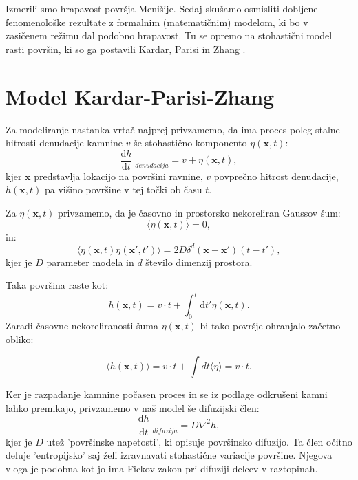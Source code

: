\documentclass[a4paper, twoside, 12pt]{book}
\begin{document}
Izmerili smo hrapavost površja Menišije. Sedaj skušamo osmisliti dobljene fenomenološke rezultate z formalnim (matematičnim) modelom, ki bo v zasičenem režimu dal podobno hrapavost. Tu se opremo na stohastični model rasti površin, ki so ga postavili Kardar, Parisi in Zhang \cite{kardar1986dynamic}.

    \section{Model Kardar-Parisi-Zhang}

    Za modeliranje nastanka vrtač najprej privzamemo, da ima proces poleg stalne hitrosti denudacije kamnine $v$ še stohastično komponento $\eta(\mathbf{x},t)$:
\begin{equation}
  \frac{\mathrm{d} h}{\mathrm{d} t} \bigg|_{denudacija} = v + \eta(\mathbf{x},t),
\end{equation}
kjer $\mathbf{x}$ predstavlja lokacijo na površini ravnine, $v$ povprečno hitrost denudacije, $h(\mathbf{x},t)$ pa višino površine v tej točki ob času $t$. 

Za $\eta (\mathbf{x},t)$ privzamemo, da je časovno in prostorsko nekoreliran Gaussov šum: 
\begin{equation} 
  \langle \eta(\mathbf{x},t) \rangle=0,
\end{equation}
in:
\begin{equation}
  \langle \eta(\mathbf{x},t) \eta(\mathbf{x'},t')\rangle = 2 D \delta^d(\mathbf{x}-\mathbf{x'})(t-t'),
\end{equation}
kjer je $D$ parameter modela in $d$ število dimenzij prostora.

Taka površina raste kot:
\begin{equation}
  h(\mathbf{x},t) = v \cdot t + \int_0^t \mathrm{d} t' \eta (\mathbf{x},t).
\end{equation}
Zaradi časovne nekoreliranosti šuma $\eta({\mathbf{x},t})$ bi tako površje ohranjalo začetno obliko:

\begin{equation}
  \langle h(\mathbf{x},t) \rangle = v \cdot t + \int dt \langle \eta \rangle = v \cdot t.
\end{equation}

Ker je razpadanje kamnine počasen proces in se iz podlage odkrušeni kamni lahko premikajo, privzamemo v naš model še difuzijski člen:
\begin{equation}
  \frac{\mathrm{d} h}{\mathrm{d} t} \bigg|_{difuzija} = D \nabla^2 h,
\end{equation}
kjer je $D$ utež 'površinske napetosti', ki opisuje površinsko difuzijo. Ta člen očitno deluje 'entropijsko'  saj želi izravnavati stohastične variacije površine. Njegova vloga je podobna kot jo ima Fickov zakon pri difuziji delcev v raztopinah.
\end{document}
